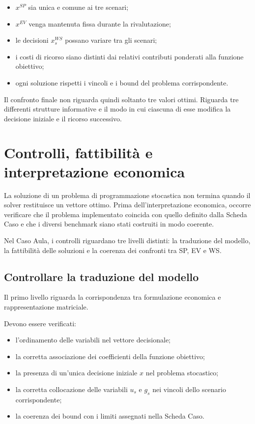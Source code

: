 \begin{itemize}
\item \(x^{SP}\) sia unica e comune ai tre scenari;

\item \(x^{EV}\) venga mantenuta fissa durante la rivalutazione;

\item le decisioni \(x_s^{WS}\) possano variare tra gli scenari;

\item i costi di ricorso siano distinti dai relativi contributi ponderati alla
funzione obiettivo;

\item ogni soluzione rispetti i vincoli e i bound del problema corrispondente.
\end{itemize}

Il confronto finale non riguarda quindi soltanto tre valori ottimi. Riguarda
tre differenti strutture informative e il modo in cui ciascuna di esse
modifica la decisione iniziale e il ricorso successivo.


\section{Controlli, fattibilit\`a e interpretazione economica}

La soluzione di un problema di programmazione stocastica non termina quando il
solver restituisce un vettore ottimo. Prima dell'interpretazione economica,
occorre verificare che il problema implementato coincida con quello definito
dalla Scheda Caso e che i diversi benchmark siano stati costruiti in modo
coerente.

Nel Caso Aula, i controlli riguardano tre livelli distinti: la traduzione del
modello, la fattibilit\`a delle soluzioni e la coerenza dei confronti tra SP,
EV e WS.

\subsection{Controllare la traduzione del modello}

Il primo livello riguarda la corrispondenza tra formulazione economica e
rappresentazione matriciale.

Devono essere verificati:

\begin{itemize}
\item l'ordinamento delle variabili nel vettore decisionale;

\item la corretta associazione dei coefficienti della funzione obiettivo;

\item la presenza di un'unica decisione iniziale \(x\) nel problema
stocastico;

\item la corretta collocazione delle variabili \(u_s\) e \(g_s\) nei vincoli
dello scenario corrispondente;

\item la coerenza dei bound con i limiti assegnati nella Scheda Caso.
\end{itemize}

